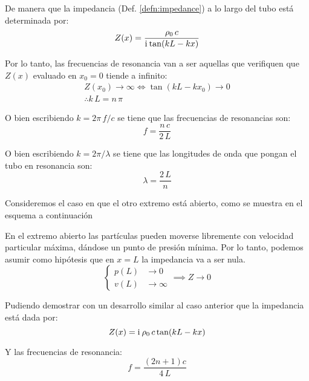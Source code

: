 \documentclass[a5paper,12pt,twoside]{book}
\begin{document}
De manera que la impedancia (Def. \ref{defn:impedance}) a lo largo del tubo está determinada por:
\begin{equation}
    Z(x) = \frac{\rho_0 \, c}{\mathrm{i}\mkern1mu \tan(kL-kx)}
\end{equation}

Por lo tanto, las frecuencias de resonancia van a ser aquellas que verifiquen que $Z(x)$ evaluado en $x_0=0$ tiende a infinito:
\begin{gather*}
    Z(x_0) \to \infty
    \iff
    \tan(kL-kx_0) \to 0
    \\
    \therefore
    k\,L = n\,\pi
\end{gather*}

O bien escribiendo $k=2\pi\, f/c$ se tiene que las frecuencias de resonancias son:
\begin{equation}
    f = \frac{n \, c}{2 \, L}
\end{equation}

O bien escribiendo $k=2\pi/\lambda$ se tiene que las longitudes de onda que pongan el tubo en resonancia son:
\begin{equation}
    \lambda = \frac{2 \, L}{n}
\end{equation}

Consideremos el caso en que el otro extremo está abierto, como se muestra en el esquema a continuación

\begin{center}
    \def\svgwidth{0.6\linewidth}
    
\end{center}

En el extremo abierto las partículas pueden moverse libremente con velocidad particular máxima, dándose un punto de presión mínima. Por lo tanto, podemos asumir como hipótesis que en $x=L$ la impedancia va a ser nula.
\begin{equation*}
    \left\{
    \begin{aligned}
        p(L) &\to 0
        \\
        v(L) &\to \infty
    \end{aligned}
    \right.
    \implies
    Z \to 0
\end{equation*}

Pudiendo demostrar con un desarrollo similar al caso anterior que la impedancia está dada por:
\begin{equation}
    Z(x) = \mathrm{i}\mkern1mu \, \rho_0 \, c \tan (kL-kx)
\end{equation}

Y las frecuencias de resonancia:
\begin{equation}
    f = \frac{\left( 2n+1 \right) c}{4 \, L}
\end{equation}
\end{document}

